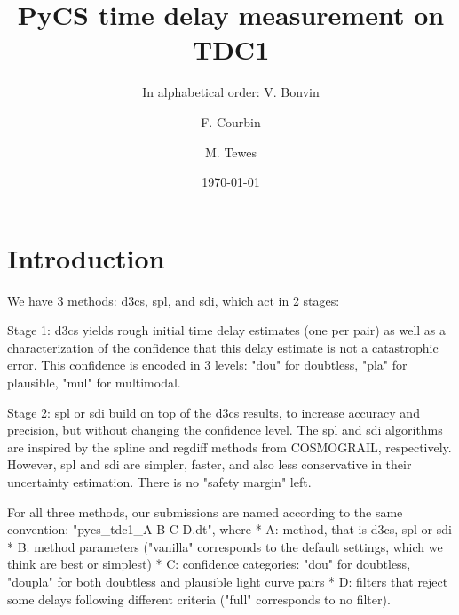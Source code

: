 \documentclass[traditabstract]{aa}
\begin{document}
\title{PyCS time delay measurement on TDC1}
\author{ In alphabetical order:
V. Bonvin\inst{\ref{epfl}} \and
F. Courbin\inst{\ref{epfl}} \and
M. Tewes\inst{\ref{bonn}}
}


\date{\today}

\maketitle



\section{Introduction}

We have 3 methods: d3cs, spl, and sdi, which act in 2 stages:

Stage 1: d3cs yields rough initial time delay estimates (one per pair) as well as a characterization of the confidence that this delay estimate is not a catastrophic error. This confidence is encoded in 3 levels: "dou" for doubtless, "pla" for plausible, "mul" for multimodal.

Stage 2: spl or sdi build on top of the d3cs results, to increase accuracy and precision, but without changing the confidence level. The spl and sdi algorithms are inspired by the spline and regdiff methods from COSMOGRAIL, respectively. However, spl and sdi are simpler, faster, and also less conservative in their uncertainty estimation. There is no "safety margin" left.

For all three methods, our submissions are named according to the same convention: "pycs\_tdc1\_A-B-C-D.dt", where
 * A: method, that is d3cs, spl or sdi
 * B: method parameters ("vanilla" corresponds to the default settings, which we think are best or simplest)
 * C: confidence categories: "dou" for doubtless, "doupla" for both doubtless and plausible light curve pairs
 * D: filters that reject some delays following different criteria ("full" corresponds to no filter).
\end{document}
